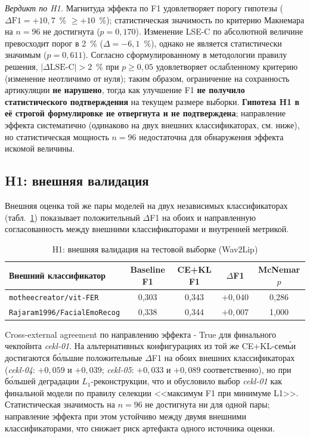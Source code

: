 \documentclass[a4paper, 12pt, oneside, openany]{article}
\begin{document}
\textit{Вердикт по H1.} Магнитуда эффекта по F1 удовлетворяет порогу гипотезы ($\Delta\text{F1} = +10{,}7$~\% $\geq +10$~\%); статистическая значимость по критерию Макнемара на $n=96$ не достигнута ($p = 0{,}170$). Изменение LSE-C по абсолютной величине превосходит порог в 2~\% ($\Delta = -6{,}1$~\%), однако не является статистически значимым ($p = 0{,}611$). Согласно сформулированному в методологии правилу решения, $|\Delta\text{LSE-C}|>2$~\% при $p \geq 0{,}05$ удовлетворяет ослабленному критерию (изменение неотличимо от нуля); таким образом, ограничение на сохранность артикуляции \textbf{не нарушено}, тогда как улучшение F1 \textbf{не получило статистического подтверждения} на текущем размере выборки. \textbf{Гипотеза H1 в её строгой формулировке не отвергнута и не подтверждена}; направление эффекта систематично (одинаково на двух внешних классификаторах, см. ниже), но статистическая мощность $n=96$ недостаточна для обнаружения эффекта искомой величины.

\subsection{H1: внешняя валидация}

Внешняя оценка той же пары моделей на двух независимых классификаторах (табл.~\ref{tab:h1_external}) показывает положительный $\Delta$F1 на обоих и направленную согласованность между внешними классификаторами и внутренней метрикой.

\begin{table}[H]
\caption{H1: внешняя валидация на тестовой выборке (Wav2Lip)}
\label{tab:h1_external}
\centering
\small
\begin{tabular}{|p{3.5cm}|c|c|c|c|}
\hline
\textbf{Внешний классификатор} & \textbf{Baseline F1} & \textbf{CE+KL F1} & $\Delta$F1 & McNemar $p$ \\
\hline
\texttt{motheecreator/vit-FER} & 0,303 & 0,343 & $+0,040$ & 0,286 \\
\hline
\texttt{Rajaram1996/FacialEmoRecog} & 0,338 & 0,344 & $+0,007$ & 1,000 \\
\hline
\end{tabular}
\end{table}

Cross-external agreement по направлению эффекта - True для финального чекпойнта \textit{cekl-01}. На альтернативных конфигурациях из той же CE+KL-сем\'ьи достигаются б\'ольшие положительные $\Delta$F1 на обоих внешних классификаторах (\textit{cekl-04}: $+0{,}059$ и $+0{,}039$; \textit{cekl-05}: $+0{,}033$ и $+0{,}089$ соответственно), но при б\'ольшей деградации $L_1$-реконструкции, что и обусловило выбор \textit{cekl-01} как финальной модели по правилу селекции <<максимум F1 при минимуме L1>>. Статистическая значимость на $n=96$ не достигнута ни для одной пары; направление эффекта при этом устойчиво между двумя внешними классификаторами, что снижает риск артефакта одного источника оценки.
\end{document}
